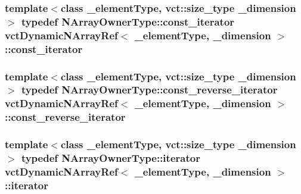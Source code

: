 \subsubsection[{const\+\_\+iterator}]{\setlength{\rightskip}{0pt plus 5cm}template$<$class \+\_\+element\+Type, vct\+::size\+\_\+type \+\_\+dimension$>$ typedef {\bf N\+Array\+Owner\+Type\+::const\+\_\+iterator} {\bf vct\+Dynamic\+N\+Array\+Ref}$<$ \+\_\+element\+Type, \+\_\+dimension $>$\+::{\bf const\+\_\+iterator}}\label{classvct_dynamic_n_array_ref_adcf4caa9e0d51a28f2baebabecc9a38b}
\hypertarget{classvct_dynamic_n_array_ref_acbbabce9e90157699716c48667704b2a}{}
\subsubsection[{const\+\_\+reverse\+\_\+iterator}]{\setlength{\rightskip}{0pt plus 5cm}template$<$class \+\_\+element\+Type, vct\+::size\+\_\+type \+\_\+dimension$>$ typedef {\bf N\+Array\+Owner\+Type\+::const\+\_\+reverse\+\_\+iterator} {\bf vct\+Dynamic\+N\+Array\+Ref}$<$ \+\_\+element\+Type, \+\_\+dimension $>$\+::{\bf const\+\_\+reverse\+\_\+iterator}}\label{classvct_dynamic_n_array_ref_acbbabce9e90157699716c48667704b2a}
\hypertarget{classvct_dynamic_n_array_ref_a790307f3b784640fd845e3a7f548374f}{}
\subsubsection[{iterator}]{\setlength{\rightskip}{0pt plus 5cm}template$<$class \+\_\+element\+Type, vct\+::size\+\_\+type \+\_\+dimension$>$ typedef {\bf N\+Array\+Owner\+Type\+::iterator} {\bf vct\+Dynamic\+N\+Array\+Ref}$<$ \+\_\+element\+Type, \+\_\+dimension $>$\+::{\bf iterator}}\label{classvct_dynamic_n_array_ref_a790307f3b784640fd845e3a7f548374f}
\hypertarget{classvct_dynamic_n_array_ref_a64f8693e4cbab79b5b73e1e3a8620dca}{}
